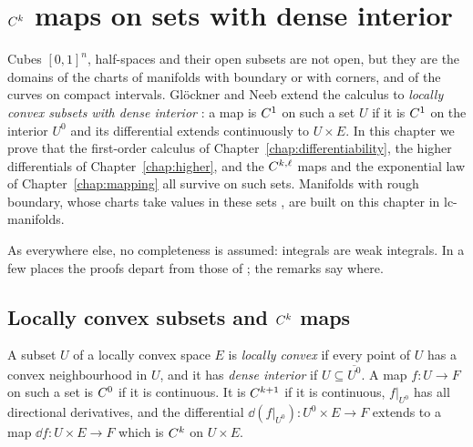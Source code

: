 \chapter{\texorpdfstring{$C^{k}$}{Ck} maps on sets with dense interior}
\label{chap:denseinterior}

Cubes $[0, 1]^n$, half-spaces and their open subsets are not open, but they are the domains of
the charts of manifolds with boundary or with corners, and of the curves on compact intervals.
Glöckner and Neeb extend the calculus to \emph{locally convex subsets with dense interior}
\cite[\S1.4]{GN26}: a map is $C^{1}$ on such a set $U$ if it is $C^{1}$ on the interior $U^0$
and its differential extends continuously to $U \times E$. In this chapter we prove that the
first-order calculus of Chapter~\ref{chap:differentiability}, the higher differentials of
Chapter~\ref{chap:higher}, and the $C^{k,\ell}$ maps and the exponential law of
Chapter~\ref{chap:mapping} all survive on such sets. Manifolds with rough boundary, whose charts
take values in these sets \cite[Definition~3.5.1]{GN26}, are built on this chapter in
lc-manifolds.

As everywhere else, no completeness is assumed: integrals are weak integrals. In a few places
the proofs depart from those of \cite{GN26}; the remarks say where.

\section{Locally convex subsets and \texorpdfstring{$C^{k}$}{Ck} maps}

\begin{definition}
  \label{def:lc-subset}
  \leanok
  A subset $U$ of a locally convex space $E$ is \emph{locally convex} if every point of $U$ has a
  convex neighbourhood in $U$, and it has \emph{dense interior} if $U \subseteq \overline{U^0}$.
  A map $f \colon U \to F$ on such a set is $C^{0}$ if it is continuous. It is $C^{k+1}$ if it
  is continuous, $f|_{U^0}$ has all directional derivatives, and the differential
  $\dd(f|_{U^0}) \colon U^0 \times E \to F$ extends to a map $\dd f \colon U \times E \to F$ which
  is $C^{k}$ on $U \times E$.
\end{definition}

